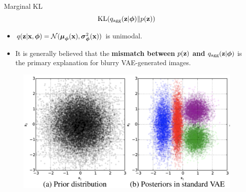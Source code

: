 \documentclass{beamer}
\begin{document}
\begin{frame}{Marginal KL}
	\[
		\mathrm{KL}(q_{\text{agg}}(\mathbf{z} | \boldsymbol{\phi}) \| p(\mathbf{z}))
	\]
	\vspace{-0.5cm}
	\begin{itemize}
		\item $q(\mathbf{z} | \mathbf{x}, \boldsymbol{\phi}) = \mathcal{N}(\boldsymbol{\mu}_{\boldsymbol{\phi}}(\mathbf{x}), \boldsymbol{\sigma}^2_{\boldsymbol{\phi}}(\mathbf{x}))$ is unimodal. 
		\item It is generally believed that the \textbf{mismatch between} $p(\mathbf{z})$  \textbf{and} $q_{\text{agg}}(\mathbf{z} | \boldsymbol{\phi})$  is the primary explanation for blurry VAE-generated images.
	\end{itemize}
    \eqpause
	\begin{figure}
		\includegraphics[width=0.8\linewidth]{figs/agg_posterior}
	\end{figure}
\end{frame}
\end{document}
